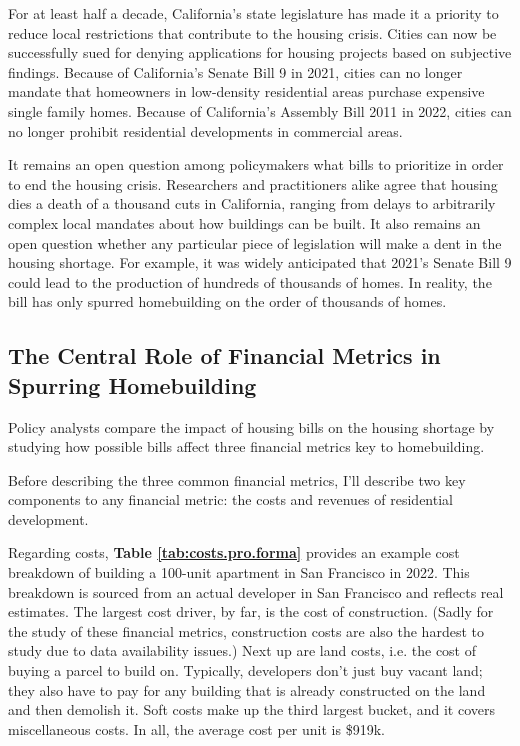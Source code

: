 \documentclass[a4paper,12pt]{article}
\begin{document}
For at least half a decade, California's state legislature has made it a priority to reduce local restrictions that contribute to the housing crisis.\cite{dougherty2020golden} Cities can now be successfully sued for denying applications for housing projects based on subjective findings.\cite{dougherty2020golden} Because of California's Senate Bill 9 in 2021, cities can no longer mandate that homeowners in low-density residential areas purchase expensive single family homes. Because of California's Assembly Bill 2011 in 2022, cities can no longer prohibit residential developments in commercial areas.

It remains an open question among policymakers what bills to prioritize in order to end the housing crisis. Researchers and practitioners alike agree that housing dies a death of a thousand cuts in California, ranging from delays to arbitrarily complex local mandates about how buildings can be built.\cite{bronin2023zoning}\cite{SFHousingElement2022} It also remains an open question whether any particular piece of legislation will make a dent in the housing shortage. For example, it was widely anticipated that 2021's Senate Bill 9 could lead to the production of hundreds of thousands of homes.\cite{metcalf2021will} In reality, the bill has only spurred homebuilding on the order of thousands of homes.\cite{GarciaAlameldin2023}

\subsection{The Central Role of Financial Metrics in Spurring Homebuilding}

Policy analysts compare the impact of housing bills on the housing shortage by studying how possible bills affect three financial metrics key to homebuilding.\cite{metcalf2021will}\cite{ab2011}\cite{la} 

Before describing the three common financial metrics, I'll describe two key components to any financial metric: the costs and revenues of residential development.

Regarding costs, \textbf{Table \ref{tab:costs.pro.forma}} provides an example cost breakdown of building a 100-unit apartment in San Francisco in 2022. This breakdown is sourced from an actual developer in San Francisco and reflects real estimates. The largest cost driver, by far, is the cost of construction. (Sadly for the study of these financial metrics, construction costs are also the hardest to study due to data availability issues.) Next up are land costs, i.e. the cost of buying a parcel to build on. Typically, developers don't just buy vacant land; they also have to pay for any building that is already constructed on the land and then demolish it. Soft costs make up the third largest bucket, and it covers miscellaneous costs. In all, the average cost per unit is \$919k.
\end{document}
